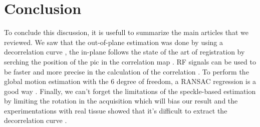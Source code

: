 \documentclass[runningheads,a4paper]{llncs}
\begin{document}
\section{Conclusion}
To conclude this discussion, it is usefull to summarize the main articles that we reviewed. We saw that the out-of-plane estimation was done by using a decorrelation curve \cite{wagner1983statistics}, the in-plane follows the state of the art of registration by serching the position of the pic in the correlation map \cite{housden2006subsample}. 
RF signals can be used to be faster and more precise in the calculation of the correlation \cite{rivaz2008ultrasound}. To perform the global motion estimation with the 6 degree of freedom, a RANSAC regression is a good way \cite{tuthill1998automated}. 
Finally, we can't forget the limitations of the speckle-based estimation by limiting the rotation in the acquisition which will bias our result \cite{kallel1994speckle} and the experimentations with real tissue showed that it's difficult to extract the decorrelation curve \cite{laporte2011learning}.

%
%
%
%
%
%
%

{\small


}
\end{document}
